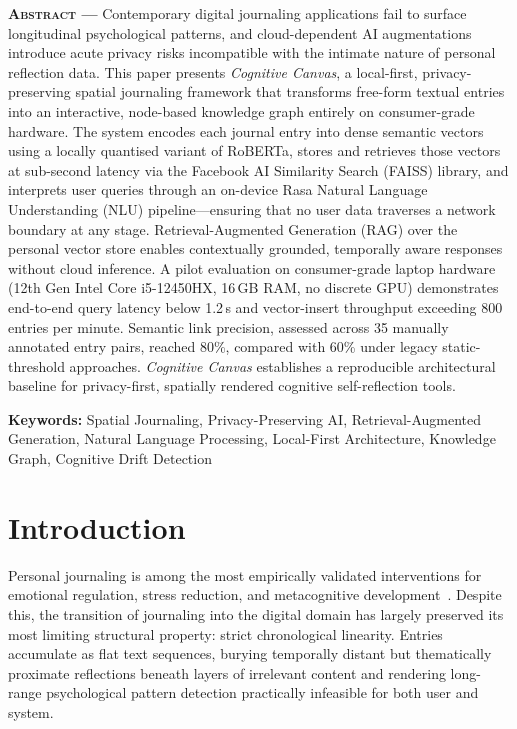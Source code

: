 \documentclass[12pt, letterpaper]{article}
\newcommand{\CC}{\textit{Cognitive Canvas}}
\begin{document}
\begin{mdframed}[style=abstractstyle]
\noindent\textbf{\textsc{Abstract} ---}
Contemporary digital journaling applications fail to surface
longitudinal psychological patterns, and cloud-dependent AI
augmentations introduce acute privacy risks incompatible with
the intimate nature of personal reflection data.
This paper presents \CC{}, a local-first, privacy-preserving
spatial journaling framework that transforms free-form textual
entries into an interactive, node-based knowledge graph
entirely on consumer-grade hardware.
The system encodes each journal entry into dense semantic
vectors using a locally quantised variant of RoBERTa, stores
and retrieves those vectors at sub-second latency via the
Facebook AI Similarity Search (FAISS) library, and interprets
user queries through an on-device Rasa Natural Language
Understanding (NLU) pipeline---ensuring that no user data
traverses a network boundary at any stage.
Retrieval-Augmented Generation (RAG) over the personal vector
store enables contextually grounded, temporally aware responses
without cloud inference.
A pilot evaluation on consumer-grade laptop hardware (12th Gen
Intel Core i5-12450HX, 16\,GB RAM, no discrete GPU) demonstrates
end-to-end query latency below 1.2\,s and vector-insert
throughput exceeding 800 entries per minute.
Semantic link precision, assessed across 35 manually annotated
entry pairs, reached 80\%, compared with 60\% under legacy
static-threshold approaches.
\CC{} establishes a reproducible architectural baseline for
privacy-first, spatially rendered cognitive self-reflection
tools.

\vspace{8pt}
\noindent\textbf{Keywords:}
Spatial Journaling,\;
Privacy-Preserving AI,\;
Retrieval-Augmented Generation,\;
Natural Language Processing,\;
Local-First Architecture,\;
Knowledge Graph,\;
Cognitive Drift Detection
\end{mdframed}

\newpage

\section{Introduction}

Personal journaling is among the most empirically validated
interventions for emotional regulation, stress reduction, and
metacognitive development~\cite{pennebaker1997,smyth1998}.
Despite this, the transition of journaling into the digital
domain has largely preserved its most limiting structural
property: strict chronological linearity.
Entries accumulate as flat text sequences, burying temporally
distant but thematically proximate reflections beneath layers
of irrelevant content and rendering long-range psychological
pattern detection practically infeasible for both user and
system.
\end{document}
